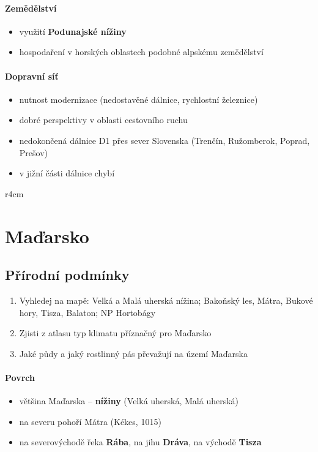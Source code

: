\paragraph{Zemědělství}
\begin{itemize}
\item využití \textbf{Podunajské nížiny}
\item hospodaření v horských oblastech podobné alpskému zemědělství 
\end{itemize}

\paragraph{Dopravní síť}
\begin{itemize}
\item nutnost modernizace (nedostavěné dálnice, rychlostní železnice)
\item dobré perspektivy v oblasti cestovního ruchu
\item nedokončená dálnice D1 přes sever Slovenska (Trenčín, Ružomberok, Poprad, Prešov)
\item v jižní části dálnice chybí
\end{itemize}



\newpage
\mbox{}
\vspace{-1.5cm}
\begin{wrapfigure}{r}{4cm}
\vspace{-50pt}
\end{wrapfigure}	
\section{Maďarsko}
\subsection{Přírodní podmínky}
\begin{enumerate}
\item Vyhledej na mapě: Velká a Malá uherská nížina; Bakoňský les, Mátra, Bukové hory, Tisza, Balaton; NP Hortobágy
\item Zjisti z atlasu typ klimatu příznačný pro Maďarsko
\item Jaké půdy a jaký rostlinný pás převažují na území Maďarska
\end{enumerate}

\paragraph{Povrch}
\begin{itemize}
\item většina Maďarska -- \textbf{nížiny} (Velká uherská, Malá uherská)
\item na severu pohoří Mátra (Kékes, 1015)
\item na severovýchodě řeka \textbf{Rába}, na jihu \textbf{Dráva}, na východě\textbf{ Tisza}
\end{itemize}


